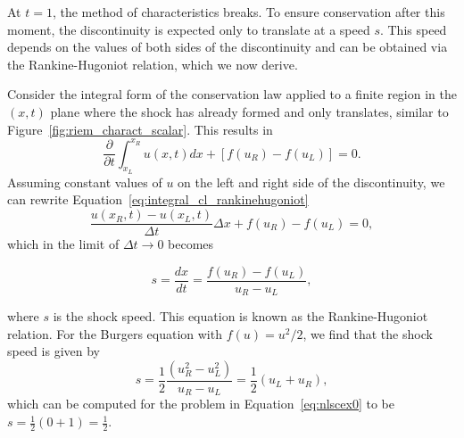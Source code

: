 At $t=1$, the method of characteristics breaks. To ensure conservation after this moment, the discontinuity is expected only to translate at a speed $s$. This speed depends on the values of both sides of the discontinuity and can be obtained via the Rankine-Hugoniot relation, which we now derive. 

Consider the integral form of the conservation law applied to a finite region in the $(x,t)$ plane where the shock has already formed and only translates, similar to Figure~\ref{fig:riem_charact_scalar}. This results in
\begin{equation}
	\frac{\partial}{\partial t} \int_{x_L}^{x_R} u(x,t) dx + [f(u_R) - f(u_L)] = 0.
	\label{eq:integral_cl_rankinehugoniot}
\end{equation}
Assuming constant values of $u$ on the left and right side of the discontinuity, we can rewrite Equation~\ref{eq:integral_cl_rankinehugoniot}
\begin{equation}
	\frac{u(x_R,t)-u(x_L,t)}{\Delta t} \Delta x + f(u_R)-f(u_L) = 0,
\end{equation}
which in the limit of $\Delta t\rightarrow 0$ becomes
\begin{eqBox}
	\begin{equation}
		s = \frac{dx}{dt} = \frac{f(u_R)-f(u_L)}{u_R-u_L},
	\end{equation}
\end{eqBox}
where $s$ is the shock speed. This equation is known as the Rankine-Hugoniot relation. For the Burgers equation with $f(u)=u^2/2$, we find that the shock speed is given by
\begin{equation}
	s = \frac{1}{2} \frac{\left(u_R^2 - u_L^2\right)}{u_R-u_L} = \frac{1}{2} \left(u_L + u_R\right),
\end{equation}
which can be computed for the problem in Equation~\ref{eq:nlscex0} to be $s=\frac{1}{2}\left(0+1\right)=\frac{1}{2}$. 
